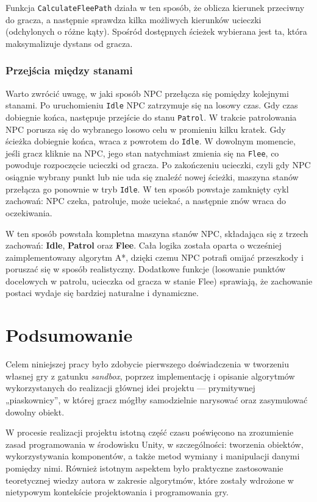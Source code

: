 \documentclass[a4paper,12pt]{book} %
\begin{document}
Funkcja \texttt{CalculateFleePath} działa w ten sposób, że oblicza kierunek przeciwny do gracza, a następnie sprawdza kilka możliwych kierunków ucieczki (odchylonych o różne kąty).  
Spośród dostępnych ścieżek wybierana jest ta, która maksymalizuje dystans od gracza.  

\subsection*{Przejścia między stanami}

Warto zwrócić uwagę, w jaki sposób NPC przełącza się pomiędzy kolejnymi stanami.  
Po uruchomieniu \texttt{Idle} NPC zatrzymuje się na losowy czas. Gdy czas dobiegnie końca, następuje przejście do stanu \texttt{Patrol}.  
W trakcie patrolowania NPC porusza się do wybranego losowo celu w promieniu kilku kratek. Gdy ścieżka dobiegnie końca, wraca z powrotem do \texttt{Idle}.  
W dowolnym momencie, jeśli gracz kliknie na NPC, jego stan natychmiast zmienia się na \texttt{Flee}, co powoduje rozpoczęcie ucieczki od gracza.  
Po zakończeniu ucieczki, czyli gdy NPC osiągnie wybrany punkt lub nie uda się znaleźć nowej ścieżki, maszyna stanów przełącza go ponownie w tryb \texttt{Idle}.  
W ten sposób powstaje zamknięty cykl zachowań: NPC czeka, patroluje, może uciekać, a następnie znów wraca do oczekiwania.


W ten sposób powstała kompletna maszyna stanów NPC, składająca się z trzech zachowań: \textbf{Idle}, \textbf{Patrol} oraz \textbf{Flee}.  
Cała logika została oparta o wcześniej zaimplementowany algorytm A*, dzięki czemu NPC potrafi omijać przeszkody i poruszać się w sposób realistyczny.  
Dodatkowe funkcje (losowanie punktów docelowych w patrolu, ucieczka od gracza w stanie Flee) sprawiają, że zachowanie postaci wydaje się bardziej naturalne i dynamiczne.


\chapter*{Podsumowanie}

Celem niniejszej pracy było zdobycie pierwszego doświadczenia w tworzeniu własnej gry z gatunku \emph{sandbox}, poprzez implementację i opisanie algorytmów wykorzystanych do realizacji głównej idei projektu --- prymitywnej „piaskownicy”, w której gracz mógłby samodzielnie narysować oraz zasymulować dowolny obiekt.  

W procesie realizacji projektu istotną część czasu poświęcono na zrozumienie zasad programowania w środowisku Unity, w szczególności: tworzenia obiektów, wykorzystywania komponentów, a także metod wymiany i manipulacji danymi pomiędzy nimi. Również istotnym aspektem było praktyczne zastosowanie teoretycznej wiedzy autora w zakresie algorytmów, które zostały wdrożone w nietypowym kontekście projektowania i programowania gry.  
\end{document}
